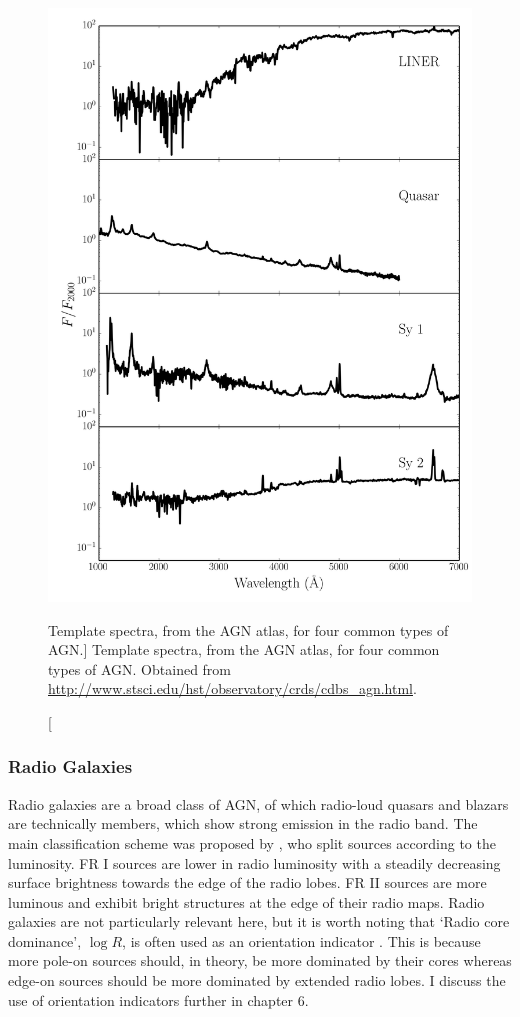 \begin{figure}
\centering
\includegraphics[width=1.0\textwidth]{figures/01-intro/agn_templates.png}
\caption
[Template spectra, from the AGN atlas, for four common types of AGN.]
{
Template spectra, from the AGN atlas, for four common types of AGN.
Obtained from \url{http://www.stsci.edu/hst/observatory/crds/cdbs_agn.html}.
} 
\label{fig:agn_templates}
\end{figure} 

\subsubsection{Radio Galaxies}

Radio galaxies are a broad class of AGN, of which radio-loud quasars and blazars are
technically members, which show strong emission in the radio band. 
The main classification scheme was proposed by \cite{FR1974}, who split
sources according to the luminosity. FR I sources are lower in radio luminosity with a steadily decreasing surface brightness towards the edge of the radio lobes.
FR II sources are more luminous and exhibit bright structures at the edge of their 
radio maps. Radio galaxies are not particularly relevant here, but it is worth 
noting that `Radio core dominance', $\log R$, is often used as an orientation indicator 
\citep{orr1982,wills1995}. This is because more pole-on sources should, in theory, 
be more dominated by their
cores whereas edge-on sources should be more dominated by extended radio
lobes. I discuss the use of orientation indicators further in chapter 6.

